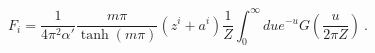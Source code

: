 \begin{equation}
  F_i = \frac{1}{4\pi^2\alpha'}\frac{m\pi}{\tanh(m\pi)} (z^i+a^i)
  \frac{1}{Z }
  \int_0^{\infty} du e^{-u} G\left(\frac{u}{2\pi Z}\right)\ .
\end{equation}

